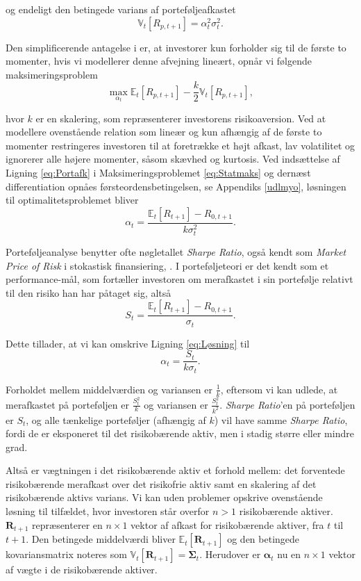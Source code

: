 \documentclass[
  a4paper,
  oneside]{memoir}
\begin{document}
og endeligt den betingede varians af porteføljeafkastet
\begin{equation}
\mathbb{V}_t\left[R_{p,t+1}\right]=\alpha_t^2\sigma_t^2.\label{eq:Varport}
\end{equation}

Den simplificerende antagelse i \citep{Markowitz1952} er, at investorer kun forholder sig til de første to momenter, hvis vi modellerer denne afvejning lineært, opnår vi følgende maksimeringsproblem
\begin{equation}
\max_{\alpha_t} \mathbb{E}_t\left[R_{p,t+1}\right] -\frac{k}{2} \mathbb{V}_t\left[R_{p,t+1}\right],\label{eq:Statmaks}
\end{equation}

hvor \(k\) er en skalering, som repræsenterer investorens risikoaversion. Ved at modellere ovenstående relation som lineær og kun afhængig af de første to momenter restringeres investoren til at foretrække et højt afkast, lav volatilitet og ignorerer alle højere momenter, såsom skævhed og kurtosis. Ved indsættelse af Ligning \eqref{eq:Portafk} i Maksimeringsproblemet \eqref{eq:Statmaks} og dernæst differentiation opnåes førsteordensbetingelsen, se Appendiks \ref{udlmyo}, løsningen til optimalitetsproblemet bliver
\begin{equation}
\alpha_t = \frac{\mathbb{E}_t\left[R_{t+1}\right]-R_{0,t+1}}{k\sigma_t^2}.\label{eq:Løsning}
\end{equation}

Porteføljeanalyse benytter ofte nøgletallet \emph{Sharpe Ratio}, også kendt som \emph{Market Price of Risk} i stokastisk finansiering, \citep{Bjork2009}. I porteføljeteori er det kendt som et performance-mål, som fortæller investoren om merafkastet i sin portefølje relativt til den risiko han har påtaget sig, altså
\[S_t=\frac{\mathbb{E}_t\left[R_{t+1}\right]-R_{0,t+1}}{\sigma_t}.\]

Dette tillader, at vi kan omskrive Ligning \eqref{eq:Løsning} til
\[\alpha_t=\frac{S_t}{k\sigma_t}.\]

Forholdet mellem middelværdien og variansen er \(\tfrac{1}{k}\), eftersom vi kan udlede, at merafkastet på porteføljen er \(\tfrac{S_t^2}{k}\) og variansen er \(\tfrac{S_t^2}{k^2}\). \emph{Sharpe Ratio}'en på porteføljen er \(S_t\), og alle tænkelige porteføljer (afhængig af \(k\)) vil have samme \emph{Sharpe Ratio}, fordi de er eksponeret til det risikobærende aktiv, men i stadig større eller mindre grad.

Altså er vægtningen i det risikobærende aktiv et forhold mellem: det forventede risikobærende merafkast over det risikofrie aktiv samt en skalering af det risikobærende aktivs varians. Vi kan uden problemer opskrive ovenstående løsning til tilfældet, hvor investoren står overfor \(n>1\) risikobærende aktiver. \(\bm{R}_{t+1}\) repræsenterer en \(n\times 1\) vektor af afkast for risikobærende aktiver, fra \(t\) til \(t+1\). Den betingede middelværdi bliver \(\mathbb{E}_t\left[\bm{R}_{t+1}\right]\) og den betingede kovariansmatrix noteres som \(\mathbb{V}_t\left[\bm{R}_{t+1}\right]=\bm{\Sigma}_t\). Herudover er \(\bm{\alpha}_t\) nu en \(n\times 1\) vektor af vægte i de risikobærende aktiver.
\end{document}
